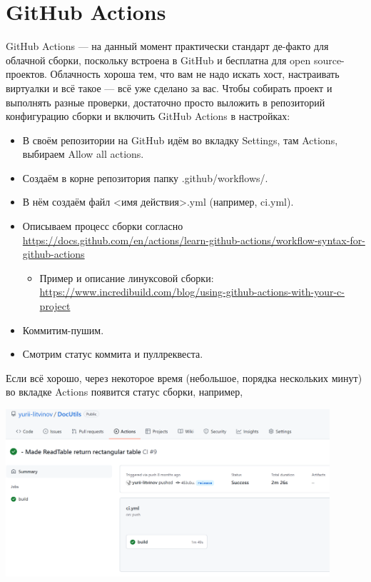 \documentclass{../../text-style}
\begin{document}
\section{GitHub Actions}

GitHub Actions --- на данный момент практически стандарт де-факто для облачной сборки, поскольку встроена в GitHub и бесплатна для open source-проектов. Облачность хороша тем, что вам не надо искать хост, настраивать виртуалки и всё такое --- всё уже сделано за вас. Чтобы собирать проект и выполнять разные проверки, достаточно просто выложить в репозиторий конфигурацию сборки и включить GitHub Actions в настройках:

\begin{itemize}
    \item В своём репозитории на GitHub идём во вкладку Settings, там Actions, выбираем Allow all actions.
    \item Создаём в корне репозитория папку .github/workflows/.
    \item В нём создаём файл <имя действия>.yml (например, ci.yml).
    \item Описываем процесс сборки согласно \url{https://docs.github.com/en/actions/learn-github-actions/workflow-syntax-for-github-actions}
    \begin{itemize}
        \item Пример и описание линуксовой сборки: \url{https://www.incredibuild.com/blog/using-github-actions-with-your-c-project}
    \end{itemize}
    \item Коммитим-пушим.
    \item Смотрим статус коммита и пуллреквеста.
\end{itemize}

Если всё хорошо, через некоторое время (небольшое, порядка нескольких минут) во вкладке Actions появится статус сборки, например,

\begin{center}
    \includegraphics[width=0.9\textwidth]{githubActionsBuildStatus.png}
\end{center}
\end{document}
